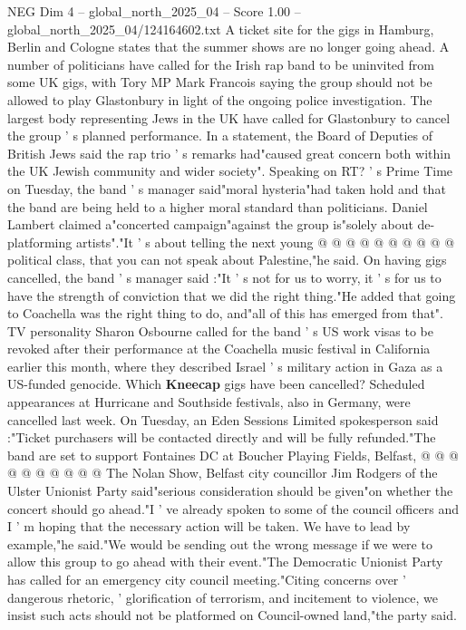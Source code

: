 \begin{textsample}{NEG Dim 4 – global\_north\_2025\_04 – Score 1.00 – global\_north\_2025\_04/124164602.txt}  \label{ex:f4_neg_233}
A ticket site for the gigs in Hamburg, Berlin and Cologne states that the summer shows are no longer going ahead.
A number of politicians have called for the Irish rap band to be uninvited from some UK gigs, with Tory MP Mark Francois saying the group should not be allowed to play Glastonbury in light of the ongoing police investigation.
The largest body representing Jews in the UK have called for Glastonbury to cancel the group ' s planned performance.
In a statement, the Board of Deputies of British Jews said the rap trio ' s remarks had"caused great concern both within the UK Jewish community and wider society".
Speaking on RT? ' s Prime Time on Tuesday, the band ' s manager said"moral hysteria"had taken hold and that the band are being held to a higher moral standard than politicians.
Daniel Lambert claimed a"concerted campaign"against the group is"solely about de-platforming artists"."It ' s about telling the next young @ @ @ @ @ @ @ @ @ @ political class, that you can not speak about Palestine,"he said.
On having gigs cancelled, the band ' s manager said :"It ' s not for us to worry, it ' s for us to have the strength of conviction that we did the right thing."He added that going to Coachella was the right thing to do, and"all of this has emerged from that".
TV personality Sharon Osbourne called for the band ' s US work visas to be revoked after their performance at the Coachella music festival in California earlier this month, where they described Israel ' s military action in Gaza as a US-funded genocide.
Which \textbf{Kneecap} gigs have been cancelled?
Scheduled appearances at Hurricane and Southside festivals, also in Germany, were cancelled last week.
On Tuesday, an Eden Sessions Limited spokesperson said :"Ticket purchasers will be contacted directly and will be fully refunded."The band are set to support Fontaines DC at Boucher Playing Fields, Belfast, @ @ @ @ @ @ @ @ @ @ The Nolan Show, Belfast city councillor Jim Rodgers of the Ulster Unionist Party said"serious consideration should be given"on whether the concert should go ahead."I ' ve already spoken to some of the council officers and I ' m hoping that the necessary action will be taken.
We have to lead by example,"he said."We would be sending out the wrong message if we were to allow this group to go ahead with their event."The Democratic Unionist Party has called for an emergency city council meeting."Citing concerns over ' dangerous rhetoric, ' glorification of terrorism, and incitement to violence, we insist such acts should not be platformed on Council-owned land,"the party said.

\end{textsample}
